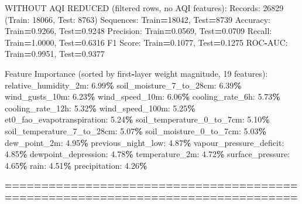 \documentclass[
  letterpaper,
  DIV=11,
  numbers=noendperiod]{scrartcl}
\newenvironment{Shaded}{\begin{snugshade}}{\end{snugshade}}
\newcommand{\BuiltInTok}[1]{#1}
\newcommand{\DecValTok}[1]{\textcolor[rgb]{0.00,0.00,0.81}{#1}}
\newcommand{\FloatTok}[1]{\textcolor[rgb]{0.00,0.00,0.81}{#1}}
\newcommand{\NormalTok}[1]{#1}
\newcommand{\OperatorTok}[1]{\textcolor[rgb]{0.81,0.36,0.00}{\textbf{#1}}}
\begin{document}
\begin{Shaded}
\begin{Highlighting}[]
\NormalTok{WITHOUT AQI REDUCED (filtered rows, no AQI features):}
\NormalTok{  Records: }\DecValTok{26829}\NormalTok{ (Train: }\DecValTok{18066}\NormalTok{, Test: }\DecValTok{8763}\NormalTok{)}
\NormalTok{  Sequences: Train}\OperatorTok{=}\DecValTok{18042}\NormalTok{, Test}\OperatorTok{=}\DecValTok{8739}
\NormalTok{  Accuracy: Train}\OperatorTok{=}\FloatTok{0.9266}\NormalTok{, Test}\OperatorTok{=}\FloatTok{0.9248}
\NormalTok{  Precision: Train}\OperatorTok{=}\FloatTok{0.0569}\NormalTok{, Test}\OperatorTok{=}\FloatTok{0.0709}
\NormalTok{  Recall: Train}\OperatorTok{=}\FloatTok{1.0000}\NormalTok{, Test}\OperatorTok{=}\FloatTok{0.6316}
\NormalTok{  F1 Score: Train}\OperatorTok{=}\FloatTok{0.1077}\NormalTok{, Test}\OperatorTok{=}\FloatTok{0.1275}
\NormalTok{  ROC}\OperatorTok{{-}}\NormalTok{AUC: Train}\OperatorTok{=}\FloatTok{0.9951}\NormalTok{, Test}\OperatorTok{=}\FloatTok{0.9377}

\NormalTok{  Feature Importance (}\BuiltInTok{sorted}\NormalTok{ by first}\OperatorTok{{-}}\NormalTok{layer weight magnitude, }\DecValTok{19}\NormalTok{ features):}
\NormalTok{    relative\_humidity\_2m: }\FloatTok{6.99}\OperatorTok{\%}
\NormalTok{    soil\_moisture\_7\_to\_28cm: }\FloatTok{6.39}\OperatorTok{\%}
\NormalTok{    wind\_gusts\_10m: }\FloatTok{6.23}\OperatorTok{\%}
\NormalTok{    wind\_speed\_10m: }\FloatTok{6.06}\OperatorTok{\%}
\NormalTok{    cooling\_rate\_6h: }\FloatTok{5.73}\OperatorTok{\%}
\NormalTok{    cooling\_rate\_12h: }\FloatTok{5.32}\OperatorTok{\%}
\NormalTok{    wind\_speed\_100m: }\FloatTok{5.25}\OperatorTok{\%}
\NormalTok{    et0\_fao\_evapotranspiration: }\FloatTok{5.24}\OperatorTok{\%}
\NormalTok{    soil\_temperature\_0\_to\_7cm: }\FloatTok{5.10}\OperatorTok{\%}
\NormalTok{    soil\_temperature\_7\_to\_28cm: }\FloatTok{5.07}\OperatorTok{\%}
\NormalTok{    soil\_moisture\_0\_to\_7cm: }\FloatTok{5.03}\OperatorTok{\%}
\NormalTok{    dew\_point\_2m: }\FloatTok{4.95}\OperatorTok{\%}
\NormalTok{    previous\_night\_low: }\FloatTok{4.87}\OperatorTok{\%}
\NormalTok{    vapour\_pressure\_deficit: }\FloatTok{4.85}\OperatorTok{\%}
\NormalTok{    dewpoint\_depression: }\FloatTok{4.78}\OperatorTok{\%}
\NormalTok{    temperature\_2m: }\FloatTok{4.72}\OperatorTok{\%}
\NormalTok{    surface\_pressure: }\FloatTok{4.65}\OperatorTok{\%}
\NormalTok{    rain: }\FloatTok{4.51}\OperatorTok{\%}
\NormalTok{    precipitation: }\FloatTok{4.26}\OperatorTok{\%}

\OperatorTok{================================================================================}


\end{Highlighting}
\end{Shaded}
\end{document}
